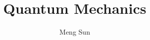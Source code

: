 \documentclass{tufte-book}
\title{Quantum Mechanics}
\author{Meng Sun}
\begin{document}
\maketitle
\tableofcontents







{}

\end{document}
